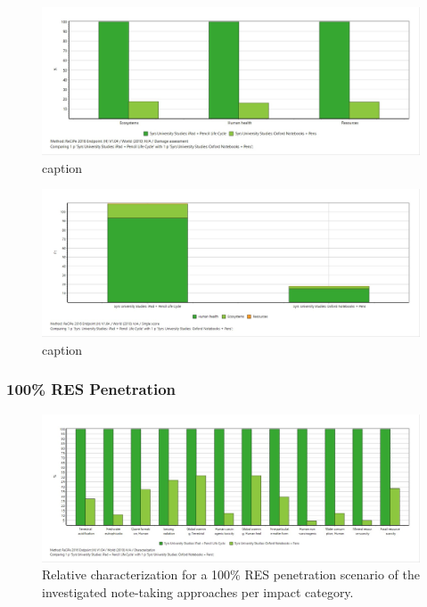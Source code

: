 \begin{figure}[H]
    \centering
    \includegraphics[width=\textwidth]{images/RES_50/Damage_Assessment_RES_50.JPG}
    \caption{caption}\label{fig:damage_assessment_RES_50}
\end{figure}

\begin{figure}[H]
    \centering
    \includegraphics[width=\textwidth]{images/RES_50/Single_Score_RES_50.JPG}
    \caption{caption}\label{fig:single_score_RES50}
\end{figure}

\subsubsection{100\% RES Penetration}

\begin{figure}[H]
    \centering
    \includegraphics[width=\textwidth]{images/RES_100/Characterization_RES_100.JPG}
    \caption{Relative characterization for a 100\% RES penetration scenario of the investigated note-taking approaches per impact category.}\label{fig:characterization_RES_100}
\end{figure}


